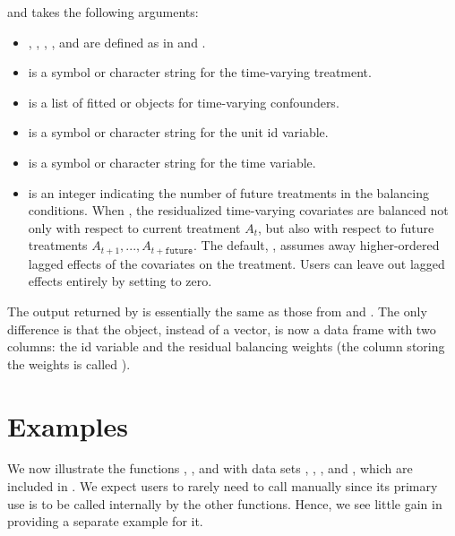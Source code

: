 and takes the following arguments:

\begin{itemize}
\tightlist
\item
  , , ,
  , and  are defined as in
   and .
\item
   is a symbol or character string for the time-varying
  treatment.
\item
   is a list of fitted  or  objects for
  time-varying confounders.
\item
   is a symbol or character string for the unit id variable.
\item
   is a symbol or character string for the time variable.
\item
   is an integer indicating the number of future treatments
  in the balancing conditions. When , the residualized
  time-varying covariates are balanced not only with respect to current
  treatment \(A_{t}\), but also with respect to future treatments
  \(A_{t+1},...,A_{t+\texttt{future}}\). The default, ,
  assumes away higher-ordered lagged effects of the covariates on the
  treatment. Users can leave out lagged effects entirely by setting
   to zero.
\end{itemize}

The output returned by  is essentially the same as
those from  and . The only difference is
that the  object, instead of a vector, is now a data frame
with two columns: the id variable and the residual balancing weights
(the column storing the weights is called ).

\hypertarget{examples}{%
\section{Examples}\label{examples}}

We now illustrate the functions , , and
 with data sets , ,
, and , which are included in
. We expect users to rarely need to call 
manually since its primary use is to be called internally by the other
functions. Hence, we see little gain in providing a separate example for
it.

